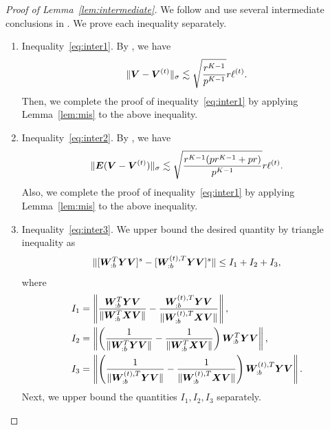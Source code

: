 \documentclass[lettersize,onecolumn,journal]{IEEEtran}
\theoremstyle{definition}
\theoremstyle{definition}
\newcommand{\of}[1]{\left(#1\right)}
\begin{document}
    \begin{proof}[Proof of Lemma~\ref{lem:intermediate}] We follow and use several intermediate conclusions in \citet[Proof of Lemma 5]{han2020exact}. We prove each inequality separately.
    \begin{enumerate}
    \item Inequality~\eqref{eq:inter1}. By \citet[Proof of Lemma 5]{han2020exact}, we have 
    \begin{equation}
         \lVert\bm{V} - \bm{V}^{(t)}\rVert_{\sigma} \lesssim \sqrt{\frac{r^{K-1}}{p^{K-1}}} r \ell^{(t)}.
    \end{equation}
    Then, we complete the proof of inequality~\eqref{eq:inter1} by applying Lemma~\ref{lem:mis} to the above inequality.
    \item Inequality~\eqref{eq:inter2}. By \citet[Proof of Lemma 5]{han2020exact}, we have 
    \begin{equation}
           \lVert\bm{E} (\bm{V} - \bm{V}^{(t)})\rVert_{\sigma} \lesssim \sqrt{ \frac{r^{K-1}(p r^{K-1} + p r)}{p^{K-1}}} r \ell^{(t)}.
    \end{equation}
    Also, we complete the proof of inequality~\eqref{eq:inter1} by applying Lemma~\ref{lem:mis} to the above inequality.
    
    \item Inequality~\eqref{eq:inter3}. We upper bound the desired quantity by triangle inequality as
    \begin{equation}
        \lVert [ \bm{W}_{:b}^T \bm Y \bm{V} ]^s   -  [ \bm{W}_{:b}^{(t), T} \bm Y \bm{V}  ]^s \rVert \leq I_1 + I_2 + I_3,
    \end{equation}
    where 
    \begin{align}
        I_1 &=  \onorm{ \frac{ \mW_{:b}^T \mY \mV  }{\onormSize{}{  \mW_{:b}^T \mX \mV }} - \frac{ \mW_{:b}^{(t), T} \mY \mV  }{ \onormSize{}{\mW_{:b}^{(t), T} \mX \mV }}   },\\
        I_2 & = \onorm{\of{ \frac{1}{\onormSize{}{\mW_{:b}^T \mY \mV}} -  \frac{1}{\onormSize{}{\mW_{:b}^T \mX \mV}}  } \mW_{:b}^T \mY \mV },\\
        I_3 &= \onorm{\of{ \frac{1}{\onormSize{}{\mW_{:b}^{(t), T} \mY \mV  }} -  \frac{1}{\onormSize{}{\mW_{:b}^{(t), T} \mX \mV  }}  } \mW_{:b}^{(t), T} \mY \mV }.
    \end{align}
    Next, we upper bound the quantities $I_1, I_2, I_3$ separately. 
    

\end{enumerate}
\end{proof}
\end{document}
